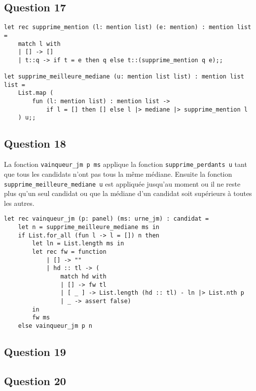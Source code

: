 \documentclass[french, 10pt, a4paper]{article}
\begin{document}
\subsection{Question 17}

\begin{verbatim}
let rec supprime_mention (l: mention list) (e: mention) : mention list =
	match l with
	| [] -> []
	| t::q -> if t = e then q else t::(supprime_mention q e);;

let supprime_meilleure_mediane (u: mention list list) : mention list list =
	List.map (
		fun (l: mention list) : mention list ->
			if l = [] then [] else l |> mediane |> supprime_mention l
	) u;;
\end{verbatim}



\subsection{Question 18}

La fonction \texttt{vainqueur_jm p ms} applique la fonction \texttt{supprime_perdants u} tant que tous les candidats n'ont pas tous la même médiane. Ensuite la fonction \texttt{supprime_meilleure_mediane u} est appliquée jusqu'au moment ou il ne reste plus qu'un seul candidat ou que la médiane d'un candidat soit supérieurs à toutes les autres.

\begin{verbatim}
let rec vainqueur_jm (p: panel) (ms: urne_jm) : candidat =
	let n = supprime_meilleure_mediane ms in
	if List.for_all (fun l -> l = []) n then
		let ln = List.length ms in
		let rec fw = function
			| [] -> ""
			| hd :: tl -> (
				match hd with
				| [] -> fw tl
				| [ _ ] -> List.length (hd :: tl) - ln |> List.nth p
				| _ -> assert false)
		in
		fw ms
	else vainqueur_jm p n
\end{verbatim}



\subsection{Question 19}




\subsection{Question 20}
\end{document}
